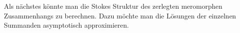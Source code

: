 \begin{comment}
Es wurde gezeigt...
\end{comment}

\begin{comment}
Stokes Struktur ausrechen? Dazu die Lösung asymptotisch approximieren
$\rightsquigarrow$ offensichtlich schwer\\
deshalb suche andere Lösung
\end{comment}
Als nächstes könnte man die Stokes Struktur des zerlegten meromorphen
Zusammenhangs zu berechnen.
Dazu möchte man die Lösungen der einzelnen Summanden asymptotisch
approximieren. 


